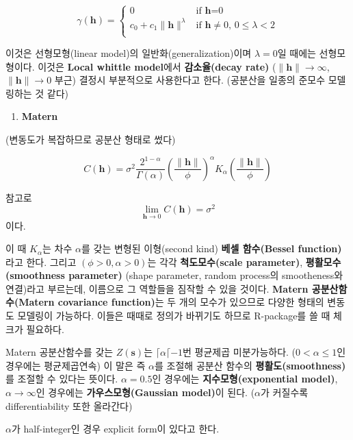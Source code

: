 \documentclass[b5paper,]{scrbook}
\providecommand{\tightlist}{%
  \setlength{\itemsep}{0pt}\setlength{\parskip}{0pt}}
\theoremstyle{plain}
\theoremstyle{definition}
\numberwithin{equation}{section}
\begin{document}
\[
\gamma(\mathbf{h})= \left\{ \begin{array}{ll}
0 & \textrm{if $\mathbf{h}$=0}\\
c_{0}+c_{1}\| \mathbf{h}\|^{\lambda} & \textrm{if $\mathbf{h}\neq 0$, $0\leq \lambda < 2$}\\
\end{array} \right.
\]

이것은 선형모형(linear model)의 일반화(generalization)이며
\(\lambda=0\)일 때에는 선형모형이다. 이것은 \textbf{Local whittle
model}에서 \textbf{감소율(decay rate)}
(\(\| \mathbf{h} \| \rightarrow \infty\),
\(\| \mathbf{h} \| \rightarrow 0\) 부근) 결정시 부분적으로 사용한다고
한다. (공분산을 일종의 준모수 모델링하는 것 같다)

\begin{enumerate}
\def\labelenumi{\arabic{enumi}.}
\setcounter{enumi}{8}
\tightlist
\item
  \textbf{Matern}
\end{enumerate}

(변동도가 복잡하므로 공분산 형태로 썼다)

\[C(\mathbf{h})=\sigma^{2}\frac{2^{1-\alpha}}{\Gamma(\alpha)}(\frac{\|\mathbf{h}\|}{\phi})^{\alpha}K_{\alpha}(\frac{\|\mathbf{h}\|}{\phi})\]

참고로 \[\lim_{\mathbf{h} \rightarrow 0}C(\mathbf{h}) = \sigma^{2}\]
이다.

이 때 \(K_{\alpha}\)는 차수 \(\alpha\)를 갖는 변형된 이형(second kind)
\textbf{베셀 함수(Bessel function)}라고 한다. 그리고
\((\phi>0,\alpha>0)\)는 각각 \textbf{척도모수(scale parameter)},
\textbf{평활모수(smoothness parameter)} (shape parameter, random
process의 smootheness와 연결)라고 부르는데, 이름으로 그 역할들을 짐작할
수 있을 것이다. \textbf{Matern 공분산함수(Matern covariance function)}는
두 개의 모수가 있으므로 다양한 형태의 변동도 모델링이 가능하다. 이들은
때때로 정의가 바뀌기도 하므로 R-package를 쓸 때 체크가 필요하다.

Matern 공분산함수를 갖는 \(Z(\mathbf{s})\)는
\(\lceil \alpha \lceil -1\)번 평균제곱 미분가능하다.
(\(0<\alpha \leq 1\)인 경우에는 평균제곱연속) 이 말은 즉 \(\alpha\)를
조절해 공분산 함수의 \textbf{평활도(smoothness)}를 조절할 수 있다는
뜻이다. \(\alpha=0.5\)인 경우에는 \textbf{지수모형(exponential model)},
\(\alpha \rightarrow \infty\)인 경우에는 \textbf{가우스모형(Gaussian
model)}이 된다. (\(\alpha\)가 커질수록 differentiability 또한 올라간다)

\(\alpha\)가 half-integer인 경우 explicit form이 있다고 한다.
\end{document}
